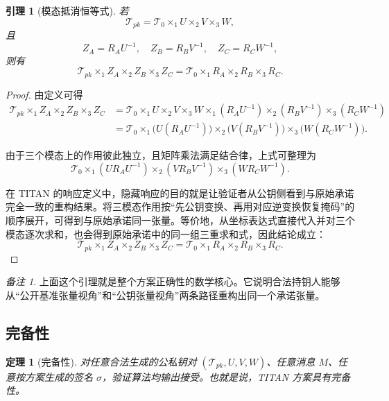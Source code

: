 \documentclass[12pt,a4paper]{article}
\newtheorem{theorem}{定理}[section]
\newtheorem{lemma}{引理}[section]
\theoremstyle{remark}
\newtheorem{remark}{备注}[section]
\begin{document}
\begin{lemma}[模态抵消恒等式]
若
\[
\mathcal{T}_{pk}=\mathcal{T}_0 \times_1 U \times_2 V \times_3 W,
\]
且
\[
Z_A=R_AU^{-1},\quad Z_B=R_BV^{-1},\quad Z_C=R_CW^{-1},
\]
则有
\[
\mathcal{T}_{pk}\times_1 Z_A\times_2 Z_B\times_3 Z_C
=\mathcal{T}_0\times_1 R_A\times_2 R_B\times_3 R_C.
\]
\end{lemma}

\begin{proof}
由定义可得
\begin{align*}
\mathcal{T}_{pk}\times_1 Z_A\times_2 Z_B\times_3 Z_C
&=\mathcal{T}_0\times_1 U\times_2 V\times_3 W
\times_1 (R_AU^{-1})
\times_2 (R_BV^{-1})
\times_3 (R_CW^{-1}) \\
&=\mathcal{T}_0\times_1 \big(U(R_AU^{-1})\big)
\times_2 \big(V(R_BV^{-1})\big)
\times_3 \big(W(R_CW^{-1})\big).
\end{align*}

由于三个模态上的作用彼此独立，且矩阵乘法满足结合律，上式可整理为
\[
\mathcal{T}_0\times_1 (UR_AU^{-1})\times_2 (VR_BV^{-1})\times_3 (WR_CW^{-1}).
\]

在 TITAN 的响应定义中，隐藏响应的目的就是让验证者从公钥侧看到与原始承诺完全一致的重构结果。将三模态作用按“先公钥变换、再用对应逆变换恢复掩码”的顺序展开，可得到与原始承诺同一张量。等价地，从坐标表达式直接代入并对三个模态逐次求和，也会得到原始承诺中的同一组三重求和式，因此结论成立：
\[
\mathcal{T}_{pk}\times_1 Z_A\times_2 Z_B\times_3 Z_C
=\mathcal{T}_0\times_1 R_A\times_2 R_B\times_3 R_C.
\]
\end{proof}

\begin{remark}
上面这个引理就是整个方案正确性的数学核心。它说明合法持钥人能够从“公开基准张量视角”和“公钥张量视角”两条路径重构出同一个承诺张量。
\end{remark}

\subsection{完备性}

\begin{theorem}[完备性]
对任意合法生成的公私钥对 $(\mathcal{T}_{pk},U,V,W)$、任意消息 $M$、任意按方案生成的签名 $\sigma$，验证算法均输出接受。也就是说，TITAN 方案具有完备性。
\end{theorem}
\end{document}
